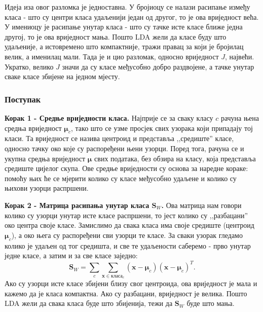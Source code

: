 \documentclass{article}
\begin{document}
	Идеја иза овог разломка је једноставна. У бројиоцу се налази расипање између класа - што су центри класа удаљенији један од другог, то је ова вриједност већа. У имениоцу је расипање унутар класа - што су тачке исте класе ближе једна другој, то је ова вриједност мања. Пошто LDA жели да класе буду што удаљеније, а истовремено што компактније, тражи правац за који је бројилац велик, а именилац мали. Тада је и цио разломак, односно вриједност $J$, највећи. Укратко, велико $J$ значи да су класе међусобно добро раздвојене, а тачке унутар сваке класе збијене на једном мјесту.
	
	
	\subsubsection{Поступак}
	
	\textbf{Корак 1 - Средње вриједности класа.} Најприје се за сваку класу $c$ рачуна њена средња вриједност $\boldsymbol{\mu}_c$, тако што се узме просјек свих узорака који припадају тој класи. Та вриједност се назива центроид и представља ,,средиште'' класе, односно тачку око које су распоређени њени узорци. Поред тога, рачуна се и укупна средња вриједност $\boldsymbol{\mu}$ свих података, без обзира на класу, која представља средиште цијелог скупа. Ове средње вриједности су основа за наредне кораке: помоћу њих ће се мјерити колико су класе међусобно удаљене и колико су њихови узорци распршени.
	
	\textbf{Корак 2 - Матрица расипања унутар класа $\mathbf{S}_W$.} Ова матрица нам говори колико су узорци унутар исте класе распршени, то јест колико су ,,разбацани'' око центра своје класе. Замислимо да свака класа има своје средиште (центроид $\boldsymbol{\mu}_c$), а око њега су распоређени сви узорци те класе. За сваки узорак гледамо колико је удаљен од тог средишта, и све те удаљености саберемо - прво унутар једне класе, а затим и за све класе заједно:
	\begin{equation} \label{eq:sw}
		\mathbf{S}_W = \sum_c \sum_{\mathbf{x} \in \text{класа}_c} (\mathbf{x} - \boldsymbol{\mu}_c)(\mathbf{x} - \boldsymbol{\mu}_c)^T.
	\end{equation}
	Ако су узорци исте класе збијени близу свог центроида, ова вриједност је мала и кажемо да је класа компактна. Ако су разбацани, вриједност је велика. Пошто LDA жели да свака класа буде што збијенија, тежи да $\mathbf{S}_W$ буде што мања.
	
\end{document}
